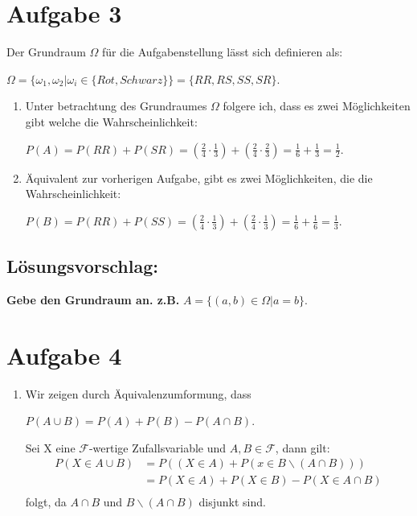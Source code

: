 \documentclass[a4paper]{scrartcl}
\begin{document}
\section*{Aufgabe 3}
Der Grundraum $\Omega$ für die Aufgabenstellung lässt sich definieren als: \vspace{6pt}
\begin{center}
    $\Omega = \{\omega_1, \omega_2 | \omega_i \in \{Rot, Schwarz\}\} = \{RR, RS, SS, SR\}$.
\end{center}
\begin{enumerate}[label=(\alph*)]
    \item Unter betrachtung des Grundraumes $\Omega$ folgere ich, dass es zwei Möglichkeiten gibt welche die Wahrscheinlichkeit: \vspace{6pt}
    \begin{center}
        $P(A) =  P(RR) + P(SR) = (\frac{2}{4} \cdot \frac{1}{3}) + (\frac{2}{4} \cdot \frac{2}{3}) = \frac{1}{6} + \frac{1}{3} = \frac{1}{2}$.
    \end{center}
    \item Äquivalent zur vorherigen Aufgabe, gibt es zwei Möglichkeiten, die die Wahrscheinlichkeit: \vspace{6pt}
    \begin{center}
        $P(B) = P(RR) + P(SS) = (\frac{2}{4} \cdot \frac{1}{3}) + (\frac{2}{4} \cdot \frac{1}{3}) = \frac{1}{6} + \frac{1}{6} = \frac{1}{3}$.
    \end{center}
\end{enumerate}

\subsection*{Lösungsvorschlag:}
\textbf{Gebe den Grundraum an. z.B.} $A = \{(a, b) \in \Omega | a = b\}$.

\section*{Aufgabe 4}
\begin{enumerate}[label=(\alph*)]
    \item Wir zeigen durch Äquivalenzumformung, dass
    \begin{center}
        $P(A \cup B) = P(A) + P(B) - P(A \cap B)$.
    \end{center}
    Sei X eine $\mathcal{F}$-wertige Zufallsvariable und $A, B \in \mathcal{F}$, dann gilt: \vspace{6pt}
    \[
    \begin{aligned}
    P(X \in A \cup B) &= P((X \in A) + P(x \in B \backslash (A \cap B))) \\
    &= P(X \in A) + P(X \in B) - P(X \in A \cap B) \\
    \end{aligned}    
    \] 
    folgt, da $A \cap B$ und $B \backslash (A \cap B)$ disjunkt sind.
\end{enumerate}
\end{document}
